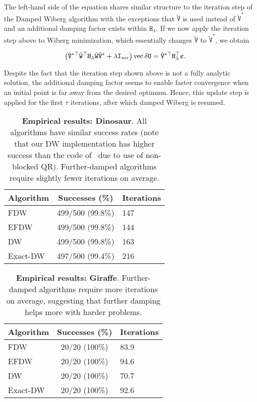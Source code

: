 \documentclass[runningheads]{llncs}
\def\tr{^\top}
\def\vec{\operatorname{vec}}
\def\m#1{\ensuremath{\mathtt{#1}}}
\def\mV{\m V}
\def\mW{\m W}
\def\twiddle#1{{\tilde{#1}}}
\def\tW{\twiddle\mW}
\def\tV{\twiddle\mV}
\begin{document}
The left-hand side of the equation shares similar structure to the iteration step of the Damped Wiberg algorithm \cite{okatani2011efficient} with the exceptions that $\tV$ is used instead of $ \tilde{\m V}^* $ and an additional damping factor exists within $ \m H_\lambda $. If we now apply the iteration step above to Wiberg minimization, which essentially changes $\tV$ to $\tilde{\m V}^*$, we obtain

\begin{align}
\left( \tilde{\m V}^{*\top} \tW \tr \m H_\lambda \tW \tilde{\m V}^* + \lambda \m I_{mr} \right)
\vec {\delta \m U} &= \tilde{\m V}^{*\top} \m H_\lambda \tr \verru.
\end{align}

Despite the fact that the iteration step shown above is not a fully analytic solution, the additional damping factor seems to enable faster convergence when an initial point is far away from the desired optimum. Hence, this update step is applied for the first $\tau$ iterations, after which damped Wiberg is resumed.

\def\spc{\hspace*{1em}}
\begin{table}[b]
\begin{center}
\begin{tabular}{l|c|@{\spc}l}
Algorithm \spc&\spc Successes (\%)\spc & Iterations\\\hline
FDW &  499/500 (99.8\%) & 147\\
EFDW & 499/500 (99.8\%) & 144\\
DW &  499/500 (99.8\%) & 163\\
Exact-DW & 497/500 (99.4\%) & 216
\end{tabular}
\end{center}
\caption{{\bf Empirical results: Dinosaur}.   All algorithms have similar success rates (note that our DW implementation has higher success than the code of~\cite{okatani2011efficient} due to use of non-blocked QR).  Further-damped algorithms require slightly fewer iterations on average.}
\label{tbl:results-dino}
\end{table}

\begin{table}[b]
\begin{center}
\begin{tabular}{l|c|@{\spc}l}
Algorithm \spc&\spc Successes (\%)\spc & Iterations\\\hline
FDW &  20/20 (100\%) & 83.9\\
EFDW & 20/20 (100\%) & 94.6\\
DW &  20/20 (100\%) & 70.7\\
Exact-DW & 20/20 (100\%) & 92.6
\end{tabular}
\end{center}
\caption{{\bf Empirical results: Giraffe}.   Further-damped algorithms require more iterations on average, suggesting that further damping helps more with harder problems.}
\label{tbl:results-giraffe}
\end{table}
\end{document}
